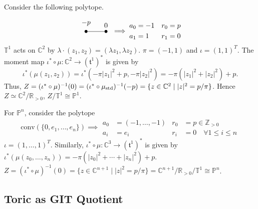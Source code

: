 \documentclass[b5paper]{article}
\begin{document}
\begin{example}{}
    Consider the following polytope.
    \begin{equation*}
        \begin{tikzpicture}[every node/.style={circle,fill=black,minimum width=1.5pt,inner sep=1.5pt}]
            \node[label={$-p$}] (A) at (0,0) {};
            \node[label={$0$}] (B) at (1,0) {};
            \draw (A) -- (B);
        \end{tikzpicture}
        \implies
        \begin{aligned}
            a_0 &= -1 & r_0 &= p \\
            a_1 &= 1 & r_1 &= 0
        \end{aligned}
    \end{equation*}
    $\mathbb{T}^1$ acts on $\mathbb{C}^2$ by $\lambda \cdot (z_1, z_2) = (\lambda z_1, \lambda z_2)$. $\pi=(-1,1)$ and $\iota=(1,1)^T$.
    The moment map $\iota^* \circ \mu : \mathbb{C}^2 \to (\mathfrak{t}^1)^*$ is given by
    \begin{equation*}
        \iota^*(\mu(z_1, z_2)) = \iota^*(-\pi|z_1|^2+p, -\pi|z_2|^2) = -\pi(|z_1|^2+|z_2|^2) + p.
    \end{equation*}
    Thus, $Z = (\iota^* \circ \mu)^{-1}(0) = (\iota^* \circ \mu_\textnormal{std})^{-1}(-p) = \{ z \in \mathbb{C}^2 \mid |z|^2 = p/\pi \}$. Hence $Z\simeq \mathbb{C}^2 / \mathbb{R}_{>0}$, $Z/\mathbb{T}^1 \cong \mathbb{P}^1$.

    For $\mathbb{P}^n$, consider the polytope
    \begin{equation*}
        \mathrm{conv}(\{ 0, e_1, \dots, e_n \})
        \implies
        \begin{aligned}
            a_0 &= (-1, \dots, -1) & r_0 &= p \in \mathbb{Z}_{>0} \\
            a_i &= e_i & r_i &= 0 \quad \forall 1 \leq i \leq n
        \end{aligned}
    \end{equation*}
    $\iota=(1,\dots ,1)^T$.
    Similarly, $\iota^* \circ \mu : \mathbb{C}^3 \to (\mathfrak{t}^1)^*$ is given by
    $\iota^*(\mu(z_0, \dots, z_n)) = -\pi(|z_0|^2+\cdots+|z_n|^2) + p$.
    $Z = (\iota^* \circ \mu)^{-1}(0) = \{ z \in \mathbb{C}^{n+1} \mid |z|^2 = p/\pi \}=\mathbb{C}^{n+1} / \mathbb{R}_{>0}/\mathbb{T}^1 \cong \mathbb{P}^n$.
\end{example}

\subsection{Toric as GIT Quotient}
\end{document}
